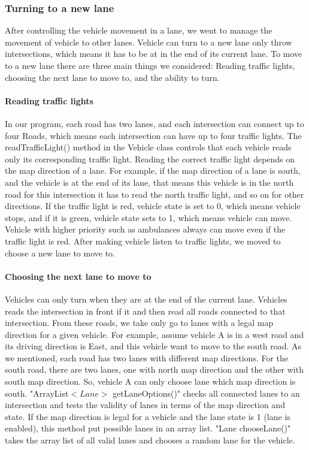 \documentclass[a4paper,11pt,titlepage]{article}
\begin{document}
\subsubsection{Turning to a new lane}
After controlling the vehicle movement in a lane, we went to manage the movement of vehicle to other lanes. Vehicle can turn to a new lane only throw intersections, which means it has to be at in the end of its current lane. To move to a new lane there are three main things we considered: Reading traffic lights, choosing the next lane to move to, and the ability to turn.
\paragraph{Reading traffic lights}
In our program, each road has two lanes, and each intersection can connect up to four Roads, which means each intersection can have up to four traffic lights. The readTrafficLight() method in the Vehicle class controls that each vehicle reads only its corresponding traffic light. Reading the correct traffic light depends on the map direction of a lane. For example, if the map direction of a lane is south, and the vehicle is at the end of its lane, that means this vehicle is in the north road for this intersection it has to read the north traffic light, and so on for other directions. If the traffic light is red, vehicle state is set to 0, which means vehicle stops, and if it is green, vehicle state sets to 1, which means vehicle can move. Vehicle with higher priority such as ambulances always can move even if the traffic light is red. After making vehicle listen to traffic lights, we moved to choose a new lane to move to.
\paragraph{Choosing the next lane to move to} 
Vehicles can only turn when they are at the end of the current lane. Vehicles reads the intersection in front if it and then read all roads connected to that intersection. From these roads, we take only go to lanes with a legal map direction for a given vehicle. For example, assume vehicle A is in a west road and its driving direction is East, and this vehicle want to move to the south road. As we mentioned, each road has two lanes with different map directions. For the south road, there are two lanes, one with north map direction and the other with south map direction. So, vehicle A can only choose lane which map direction is south. 
"ArrayList$<Lane>$ getLaneOptions()" checks all connected lanes to an intersection and tests the validity of lanes in terms of the map direction and state. If the map direction is legal for a vehicle and the lane state is 1 (lane is enabled), this method put possible lanes in an array list. 
"Lane chooseLane()" takes the array list of all valid lanes and chooses a random lane for the vehicle.
\end{document}
